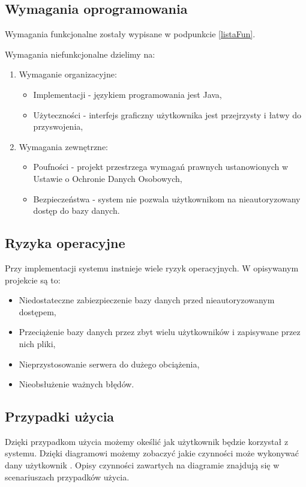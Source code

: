 \subsection{Wymagania oprogramowania}
Wymagania funkcjonalne zostały wypisane w podpunkcie \ref{listaFun}.

Wymagania niefunkcjonalne dzielimy na:
\begin{enumerate}
	\item Wymaganie organizacyjne:
		\begin{itemize}
			\item Implementacji - językiem programowania jest Java,
			\item Użyteczności - interfejs graficzny użytkownika jest przejrzysty i łatwy do przyswojenia,
		\end{itemize}
	\item Wymagania zewnętrzne:		
		\begin{itemize}
			\item Poufności - projekt przestrzega wymagań prawnych ustanowionych w Ustawie o Ochronie Danych Osobowych,
			\item Bezpieczeństwa - system nie pozwala użytkownikom na nieautoryzowany dostęp do bazy danych.
		\end{itemize}
\end{enumerate}
\subsection{Ryzyka operacyjne}
Przy implementacji systemu instnieje wiele ryzyk operacyjnych. W opisywanym projekcie są to:
\begin{itemize}
	\item Niedostateczne zabiezpieczenie bazy danych przed nieautoryzowanym dostępem,
	\item Przeciążenie bazy danych przez zbyt wielu użytkowników i zapisywane przez nich pliki,
	\item Nieprzystosowanie serwera do dużego obciążenia,
	\item Nieobsłużenie ważnych błędów.
\end{itemize}
\subsection{Przypadki użycia}
Dzięki przypadkom użycia możemy okeślić jak użytkownik będzie korzystał z systemu. Dzięki diagramowi możemy zobaczyć jakie czynności może wykonywać dany użytkownik \cite{DOC03}. Opisy czynności zawartych na diagramie znajdują się w scenariuszach przypadków użycia.

